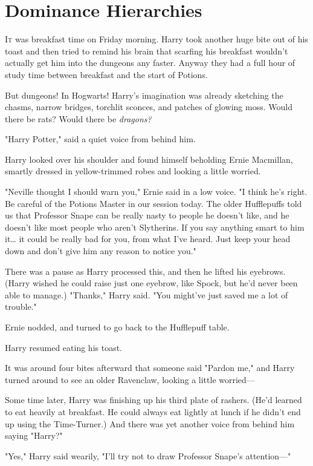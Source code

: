 \chapter{Dominance Hierarchies}

\lettrine{I}{t} was breakfast time on Friday morning. Harry took another huge bite out of 
his toast and then tried to remind his brain that scarfing his breakfast 
wouldn't actually get him into the dungeons any faster. Anyway they had a full 
hour of study time between breakfast and the start of Potions.

But dungeons! In Hogwarts! Harry's imagination was already sketching the 
chasms, narrow bridges, torchlit sconces, and patches of glowing moss. Would 
there be rats? Would there be \emph{dragons?}

"Harry Potter," said a quiet voice from behind him.

Harry looked over his shoulder and found himself beholding Ernie Macmillan, 
smartly dressed in yellow-trimmed robes and looking a little worried.

"Neville thought I should warn you," Ernie said in a low voice. "I think he's 
right. Be careful of the Potions Master in our session today. The older 
Hufflepuffs told us that Professor Snape can be really nasty to people he 
doesn't like, and he doesn't like most people who aren't Slytherins. If you say 
anything smart to him it{\ldots} it could be really bad for you, from what I've 
heard. Just keep your head down and don't give him any reason to notice you."

There was a pause as Harry processed this, and then he lifted his eyebrows. 
(Harry wished he could raise just one eyebrow, like Spock, but he'd never been 
able to manage.) "Thanks," Harry said. "You might've just saved me a lot of 
trouble."

Ernie nodded, and turned to go back to the Hufflepuff table.

Harry resumed eating his toast.

It was around four bites afterward that someone said "Pardon me," and Harry 
turned around to see an older Ravenclaw, looking a little worried---

Some time later, Harry was finishing up his third plate of rashers. (He'd 
learned to eat heavily at breakfast. He could always eat lightly at lunch if he 
didn't end up using the Time-Turner.) And there was yet another voice from 
behind him saying "Harry?"

"Yes," Harry said wearily, "I'll try not to draw Professor Snape's attention---"

